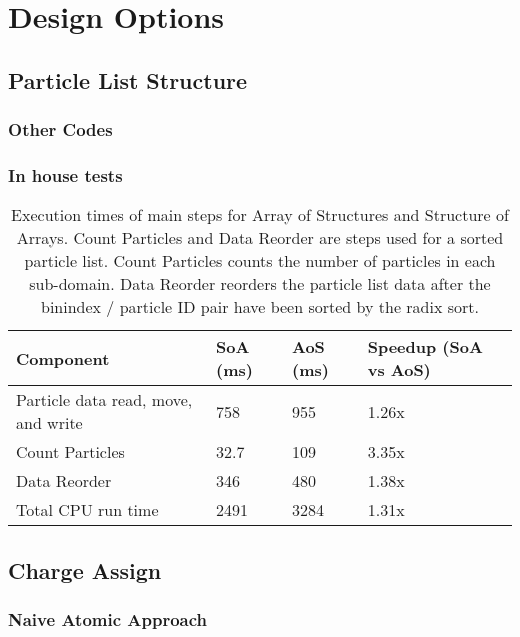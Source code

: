 \chapter{Design Options}
\label{ch:design}

	\section{Particle List Structure}
		\subsection{Other Codes}
		\subsection{In house tests}
\noindent \begin{table}[h]
\begin{tabular}{| p{4.0cm} | p{3.5cm} | p{2.5cm} | p{4.0cm} |}
\hline
Component & SoA (ms) & AoS (ms) & Speedup (SoA vs AoS) \\ \hline
Particle data read, move, and write & 758 & 955 & 1.26x \\ \hline
Count Particles & 32.7 & 109 & 3.35x \\ \hline
Data Reorder & 346 & 480 & 1.38x \\ \hline
Total CPU run time & 2491 & 3284 & 1.31x \\ \hline
\end{tabular}
\caption{Execution times of main steps for Array of Structures and Structure of Arrays. Count Particles and Data Reorder are steps used for a sorted particle list. Count Particles counts the number of particles in each sub-domain. Data Reorder reorders the particle list data after the binindex / particle ID pair have been sorted by the radix sort.}
\label{tab:struct_compare} 
\end{table}

	\section{Charge Assign}
		\subsection{Naive Atomic Approach}
